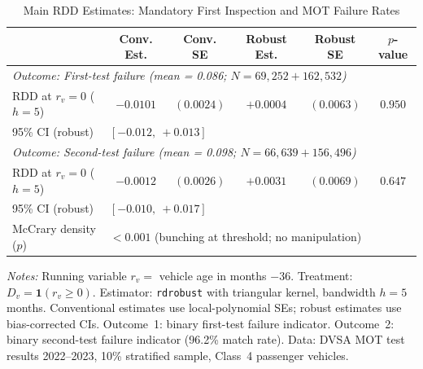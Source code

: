 \begin{table}[htbp]
\centering
\caption{Main RDD Estimates: Mandatory First Inspection and MOT Failure Rates}\label{tab:tab:main_rdd}
\begin{threeparttable}
\small
\begin{tabular}{lccccc}
\toprule
 & Conv. Est. & Conv. SE & Robust Est. & Robust SE & $p$-value \\
\midrule
\multicolumn{6}{l}{\textit{Outcome: First-test failure (mean = 0.086; $N = 69{,}252 + 162{,}532$)}} \\
\midrule
RDD at $r_v = 0$ ($h = 5$) & $-0.0101$ & $(0.0024)$ & $+0.0004$ & $(0.0063)$ & $0.950$ \\
95\% CI (robust) & \multicolumn{5}{l}{$[-0.012, \ +0.013]$} \\
\midrule
\multicolumn{6}{l}{\textit{Outcome: Second-test failure (mean = 0.098; $N = 66{,}639 + 156{,}496$)}} \\
\midrule
RDD at $r_v = 0$ ($h = 5$) & $-0.0012$ & $(0.0026)$ & $+0.0031$ & $(0.0069)$ & $0.647$ \\
95\% CI (robust) & \multicolumn{5}{l}{$[-0.010, \ +0.017]$} \\
\midrule
McCrary density ($p$) & \multicolumn{5}{l}{$< 0.001$ (bunching at threshold; no manipulation)} \\
\bottomrule
\end{tabular}
\begin{tablenotes}
\item {\footnotesize \textit{Notes:} Running variable $r_v =$ vehicle age in months $- 36$. Treatment: $D_v = \mathbf{1}(r_v \geq 0)$. Estimator: \texttt{rdrobust} with triangular kernel, bandwidth $h = 5$ months. Conventional estimates use local-polynomial SEs; robust estimates use bias-corrected \citet{Calonico2014} CIs. Outcome~1: binary first-test failure indicator. Outcome~2: binary second-test failure indicator (96.2\% match rate). Data: DVSA MOT test results 2022--2023, 10\% stratified sample, Class~4 passenger vehicles.}
\end{tablenotes}
\end{threeparttable}
\end{table}
